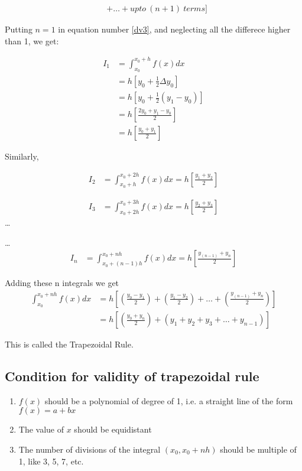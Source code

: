 \documentclass{article}
\begin{document}
    \begin{align}\label{dv3}
        &+ \dots+upto\ (n+1)\ terms]
    \end{align}
    
    Putting $n=1$ in equation number \ref{dv3}, and neglecting all the differece 
    higher than 1, we get:
    
    \begin{align*}
      I_1 &= \int_{x_0}^{x_0+h}f(x)dx\\
          &= h[y_0+\frac{1}{2}\Delta y_0]\\
          &= h[y_0+\frac{1}{2}(y_1-y_0)]\\
          &= h[\frac{2y_0+y_1-y_0}{2}]\\
          &= h[\frac{y_0+y_1}{2}]
    \end{align*}
    
    Similarly,
    
    \begin{align*}
      I_2 &= \int_{x_0+h}^{x_0+2h}f(x)dx = h[\frac{y_1+y_2}{2}]
    \end{align*}
    
    \begin{align*}
      I_3 &= \int_{x_0+2h}^{x_0+3h}f(x)dx = h[\frac{y_2+y_3}{2}]
    \end{align*}
    \dots 
    
    \dots 
    \begin{align*}
      I_n &= \int_{x_0+(n-1)h}^{x_0+nh}f(x)dx = h[\frac{y_{(n-1)}+y_n}{2}]
    \end{align*}
    
    Adding these n integrals we get
    \begin{align*}
      \int_{x_0}^{x_0+nh}f(x)dx &= h[(\frac{y_0-y_1}{2})+(\frac{y_1-y_2}{2})+\dots+(\frac{y_{(n-1)}+y_n}{2})]\\
                                &= h[(\frac{y_0+y_n}{2})+(y_1+y_2+y_3+\dots+y_{n-1})]
    \end{align*}
    
    This is called the Trapezoidal Rule.
    
    \subsection{Condition for validity of trapezoidal rule}
    \begin{enumerate}
      \item $f(x)$ should be a polynomial of degree of 1, i.e. a 
        straight line of the form $f(x)=a+bx$
      \item The value of $x$ should be equidistant
      \item The number of divisions of the integral $(x_0,x_0+nh)$ 
        should be multiple of 1, like 3, 5, 7, etc.
    \end{enumerate}
  
\end{document}
